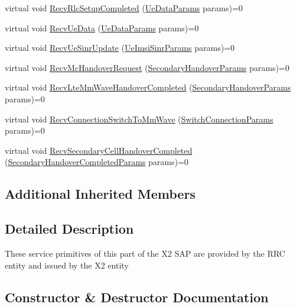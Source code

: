 \begin{DoxyCompactItemize}
\item 
virtual void \hyperlink{classns3_1_1EpcX2SapUser_a6aea3dfa4b9483ef32463a0564eaa098}{Recv\+Rlc\+Setup\+Completed} (\hyperlink{structns3_1_1EpcX2Sap_1_1UeDataParams}{Ue\+Data\+Params} params)=0
\item 
virtual void \hyperlink{classns3_1_1EpcX2SapUser_a0a351188eaed5eb135daee0ee01950f0}{Recv\+Ue\+Data} (\hyperlink{structns3_1_1EpcX2Sap_1_1UeDataParams}{Ue\+Data\+Params} params)=0
\item 
virtual void \hyperlink{classns3_1_1EpcX2SapUser_ab14ff4814fc40ca604d03654ab310a44}{Recv\+Ue\+Sinr\+Update} (\hyperlink{structns3_1_1EpcX2Sap_1_1UeImsiSinrParams}{Ue\+Imsi\+Sinr\+Params} params)=0
\item 
virtual void \hyperlink{classns3_1_1EpcX2SapUser_a7eecce34706ef7c77ccdc9623822ce33}{Recv\+Mc\+Handover\+Request} (\hyperlink{structns3_1_1EpcX2Sap_1_1SecondaryHandoverParams}{Secondary\+Handover\+Params} params)=0
\item 
virtual void \hyperlink{classns3_1_1EpcX2SapUser_a900e3a0a064301f257351bab3288753d}{Recv\+Lte\+Mm\+Wave\+Handover\+Completed} (\hyperlink{structns3_1_1EpcX2Sap_1_1SecondaryHandoverParams}{Secondary\+Handover\+Params} params)=0
\item 
virtual void \hyperlink{classns3_1_1EpcX2SapUser_ae11a4786c547ba2c41aba6c5d4c9d1da}{Recv\+Connection\+Switch\+To\+Mm\+Wave} (\hyperlink{structns3_1_1EpcX2Sap_1_1SwitchConnectionParams}{Switch\+Connection\+Params} params)=0
\item 
virtual void \hyperlink{classns3_1_1EpcX2SapUser_adb0b6750c0bf917699fe87e84270aebb}{Recv\+Secondary\+Cell\+Handover\+Completed} (\hyperlink{structns3_1_1EpcX2Sap_1_1SecondaryHandoverCompletedParams}{Secondary\+Handover\+Completed\+Params} params)=0
\end{DoxyCompactItemize}
\subsection*{Additional Inherited Members}


\subsection{Detailed Description}
These service primitives of this part of the X2 S\+AP are provided by the R\+RC entity and issued by the X2 entity 

\subsection{Constructor \& Destructor Documentation}
